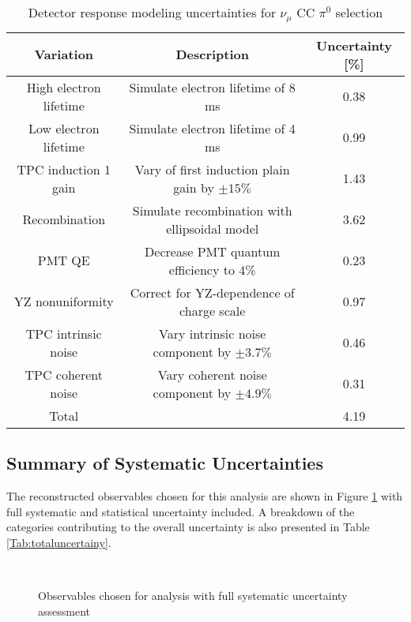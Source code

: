 \documentclass[../main.tex]{subfiles}
\begin{document}
\begin{table}[H]
    \caption{Detector response modeling uncertainties for $\nu_{\mu}$ CC $\pi^{0}$ selection}
    \vspace{0.1cm}
    \centering
    \begin{tabular}{ c c c } 
    \hline
    Variation & Description & Uncertainty [\%] \\
    \hline
    High electron lifetime & Simulate electron lifetime of 8 ms & 0.38 \\
    Low electron lifetime & Simulate electron lifetime of 4 ms & 0.99 \\
    TPC induction 1 gain & Vary of first induction plain gain by $\pm 15 \%$  & 1.43 \\
    Recombination & Simulate recombination with ellipsoidal model & 3.62 \\
    PMT QE & Decrease PMT quantum efficiency to 4\% & 0.23 \\
    YZ nonuniformity & Correct for YZ-dependence of charge scale & 0.97 \\
    TPC intrinsic noise & Vary intrinsic noise component by $\pm 3.7\%$ & 0.46 \\
    TPC coherent noise & Vary coherent noise component by $\pm 4.9\%$ & 0.31 \\
    \hline
    Total & & 4.19 \\
    \hline
    \end{tabular}
    \label{Tab:detparameters}
\end{table}

\subsection{Summary of Systematic Uncertainties}
The reconstructed observables chosen for this analysis are shown in Figure \ref{fig:reco_observables_syst} with full systematic and statistical uncertainty included.  A breakdown of the categories contributing to the overall uncertainty is also presented in Table \ref{Tab:totaluncertainy}.

\begin{figure}[H]
    \center
     \\
    \caption{Observables chosen for analysis with full systematic uncertainty assessment}
    \label{fig:reco_observables_syst}
\end{figure}
\end{document}

